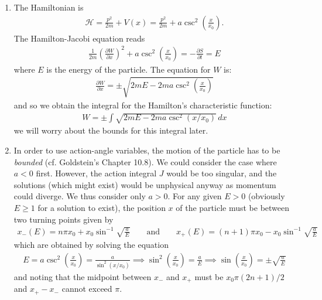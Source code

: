 \documentclass{article}
\theoremstyle{definition}
\newcommand{\p}{\partial}
\newcommand{\ham}{\mathcal{H}}
\newcommand{\f}[2]{\frac{#1}{#2}}
\newcommand{\lp}{\left(}
\newcommand{\rp}{\right)}
\begin{document}
\begin{enumerate}[label=(\alph*)]
	\item The Hamiltonian is 
	\begin{align*}
	\ham = \f{p^2}{2m} + V(x) = \f{p^2}{2m} + a\csc^2\lp \f{x}{x_0} \rp.
	\end{align*}
	The Hamilton-Jacobi equation reads
	\begin{align*}
	\f{1}{2m}\lp \f{\p W}{\p x} \rp^2 + a\csc^2\lp \f{x}{x_0} \rp = - \f{\p S}{\p t} = E
	\end{align*}
	where $E$ is the energy of the particle. The equation for $W$ is:
	\begin{align*}
	\f{\p W}{\p x} = \pm \sqrt{2mE - 2m a\csc^2\lp \f{x}{x_0} \rp}
	\end{align*}
	and so we obtain the integral for the Hamilton's characteristic function:
	\begin{align*}
	\boxed{W = \pm \int \sqrt{2mE - 2ma\csc^2\lp x/x_0\rp}\,dx}
	\end{align*}
	we will worry about the bounds for this integral later.  
	
	
	
	\item In order to use action-angle variables, the motion of the particle has to be \textit{bounded} (cf. Goldstein's Chapter 10.8). We could consider the case where $a<0$ first. However, the action integral $J$ would be too singular, and the solutions (which might exist) would be unphysical anyway as momentum could diverge. We thus consider only $a>0$. For any given $E>0$ (obviously $E\geq 1$ for a solution to exist), the position $x$ of the particle must be between two turning points given by 
	\begin{align*}
	x_-(E) = n\pi x_0 +  x_0\sin^{-1}\sqrt{\f{a}{E}} \quad\quad \text{and}\quad\quad x_+(E) = (n+1)\pi x_0 -  x_0\sin^{-1}\sqrt{\f{a}{E}} 
	\end{align*}
	which are obtained by solving the equation
	\begin{align*}
	E = a\csc^2\lp \f{x}{x_0} \rp = \f{a}{\sin^2(x/x_0)} \implies \sin^2\lp \f{x}{x_0} \rp = \f{a}{E}\implies \sin\lp \f{x}{x_0} \rp = \pm\sqrt{\f{a}{E}}
	\end{align*}
	and noting that the midpoint between $x_-$ and $x_+$ must be $x_0\pi (2n+1)/2$ and $x_+ - x_-$ cannot exceed $\pi$. 
	

\end{enumerate}
\end{document}
